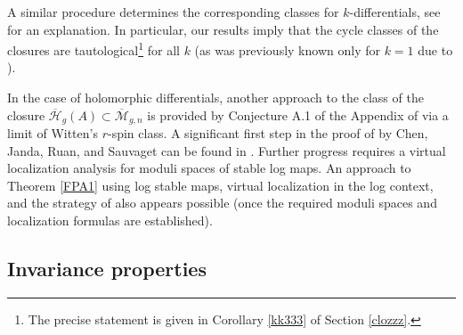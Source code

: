 \documentclass[a4paper,12pt]{article} %
\def\oM{\overline{\mathcal{M}}}
\def\HH{\mathcal{H}}
\theoremstyle{definition}
\theoremstyle{plain}%
\newcommand{\jocomment}[1]{}
\begin{document}
A similar procedure determines the corresponding classes for $k$-differentials, see \cite[Section 3.4]{Schmitt2016Dimension-theor} for an explanation. In particular, 
our results imply that the cycle classes of the closures 
are tautological{\footnote{The precise statement is given in
Corollary \ref{kk333} of Section \ref{clozzz}.}} 
for all $k$ (as was previously known only for $k=1$ due to \cite{Sauvaget2017Cohomology-clas}).

In the case of holomorphic differentials, another approach to the class of
the closure $\overline{\HH}_g(A) \subset \oM_{g,n}$ is provided
by Conjecture A.1 of the Appendix of \cite{Pandharipande2019Tautological-re} via a limit of
Witten's $r$-spin class. A significant first step in the proof of \cite[Conjecture A.1]{Pandharipande2019Tautological-re} by 
Chen, Janda, Ruan, and Sauvaget can be found in \cite{Chen2018Towards-a-Theor}. Further progress
requires 
a virtual localization analysis for moduli spaces of 
stable log maps. An approach to 
Theorem \ref{FPA1} using log stable maps, virtual localization in the log context, and
the strategy of \cite{Janda2016Double-ramifica} also appears possible (once the
required moduli spaces and localization formulas are established).



\subsection{Invariance properties} \label{Sect:introinvariance}
\end{document}
